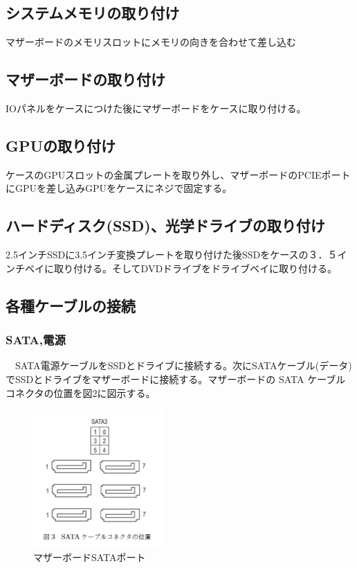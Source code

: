 \documentclass[10pt]{article}
\begin{document}
\subsection{システムメモリの取り付け}
\hspace{1cm}マザーボードのメモリスロットにメモリの向きを合わせて差し込む
	

\subsection{マザーボードの取り付け}
\hspace{1cm}IOパネルをケースにつけた後にマザーボードをケースに取り付ける。


\subsection{GPUの取り付け}
\hspace{1cm}ケースのGPUスロットの金属プレートを取り外し、マザーボードのPCIEポートにGPUを差し込みGPUをケースにネジで固定する。


\subsection{ハードディスク(SSD)、光学ドライブの取り付け}
\hspace{1cm}2.5インチSSDに3.5インチ変換プレートを取り付けた後SSDをケースの３．５インチベイに取り付ける。そしてDVDドライブをドライブベイに取り付ける。

\subsection{各種ケーブルの接続}
\subsubsection{SATA,電源}\hspace{1cm}　SATA電源ケーブルをSSDとドライブに接続する。次にSATAケーブル(データ)でSSDとドライブをマザーボードに接続する。マザーボードの SATA ケーブルコネクタの位置を図2に図示する。

\begin{figure}[H]
	\centering
	\includegraphics[width=5cm]{SATA.png}
	\caption{マザーボードSATAポート}
\end{figure}
\end{document}
